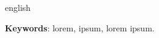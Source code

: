 \begin{resumo}[Abstract]
\begin{otherlanguage*}{english}

\lipsum[3 - 4]

\textbf{Keywords}: lorem, ipsum, lorem ipsum.
\end{otherlanguage*}
\end{resumo}
